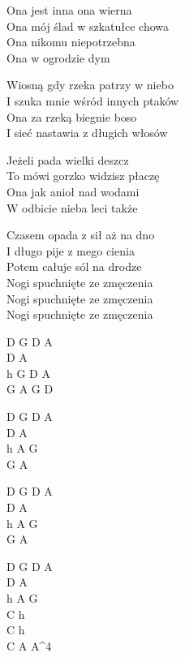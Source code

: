 \begin{text}
    Ona jest inna ona wierna\\
    Ona mój ślad w szkatułce chowa\\
    Ona nikomu niepotrzebna\\
    Ona w ogrodzie dym

    Wiosną gdy rzeka patrzy w niebo\\
    I szuka mnie wśród innych ptaków\\
    Ona za rzeką biegnie boso\\
    I sieć nastawia z długich włosów

    Jeżeli pada wielki deszcz\\
    To mówi gorzko widzisz płaczę\\
    Ona jak anioł nad wodami\\
    W odbicie nieba leci także

    Czasem opada z sił aż na dno\\
    I długo pije z mego cienia\\
    Potem całuje sól na drodze\\
    Nogi spuchnięte ze zmęczenia\\
    Nogi spuchnięte ze zmęczenia\\
    Nogi spuchnięte ze zmęczenia
\end{text}
\begin{chord}
    D G D A\\
    D A\\
    h G D A\\
    G A G D

    D G D A\\
    D A\\
    h A G\\
    G A

    D G D A\\
    D A\\
    h A G\\
    G A

    D G D A\\
    D A\\
    h A G\\
    C h\\
    C h\\
    C A A^4
\end{chord}